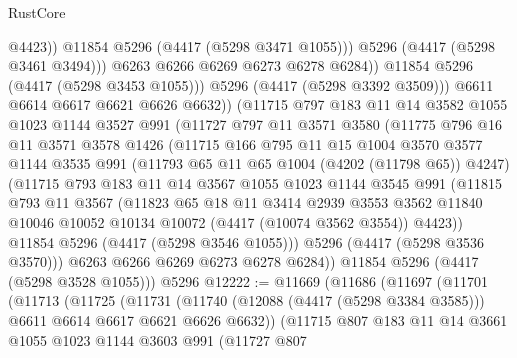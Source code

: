 \begin{lexlean}{RustCore}
\begin{coremodule}
                        @4423))
                    @11854
                    @5296
                    (@4417 (@5298 @3471 @1055)))
                  @5296
                  (@4417 (@5298 @3461 @3494)))
                @6263
                @6266
                @6269
                @6273
                @6278
                @6284))
            @11854
            @5296
            (@4417 (@5298 @3453 @1055)))
          @5296
          (@4417 (@5298 @3392 @3509)))
        @6611
        @6614
        @6617
        @6621
        @6626
        @6632))
    (@11715
      @797
      @183
      @11
      @14
      @3582
      @1055
      @1023
      @1144
      @3527
      @991
      (@11727
        @797
        @11
        @3571
        @3580
        (@11775
          @796
          @16
          @11
          @3571
          @3578
          @1426
          (@11715
            @166
            @795
            @11
            @15
            @1004
            @3570
            @3577
            @1144
            @3535
            @991
            (@11793 @65 @11 @65 @1004 (@4202 (@11798 @65)) @4247)
            (@11715
              @793
              @183
              @11
              @14
              @3567
              @1055
              @1023
              @1144
              @3545
              @991
              (@11815
                @793
                @11
                @3567
                (@11823
                  @65
                  @18
                  @11
                  @3414
                  @2939
                  @3553
                  @3562
                  @11840
                  @10046
                  @10052
                  @10134
                  @10072
                  (@4417 (@10074 @3562 @3554))
                  @4423))
              @11854
              @5296
              (@4417 (@5298 @3546 @1055)))
            @5296
            (@4417 (@5298 @3536 @3570)))
          @6263
          @6266
          @6269
          @6273
          @6278
          @6284))
      @11854
      @5296
      (@4417 (@5298 @3528 @1055)))
    @5296
@12222 := @11669
    (@11686
      (@11697
        (@11701
          (@11713
            (@11725
              (@11731
                (@11740 (@12088 (@4417 (@5298 @3384 @3585))) @6611 @6614 @6617 @6621 @6626 @6632))
              (@11715
                @807
                @183
                @11
                @14
                @3661
                @1055
                @1023
                @1144
                @3603
                @991
                (@11727
                  @807

\end{coremodule}
\end{lexlean}
